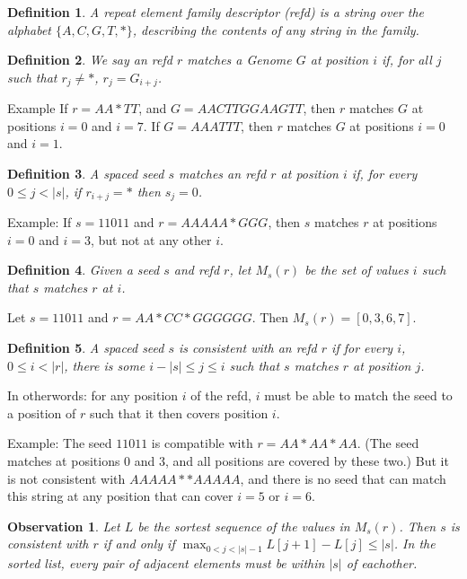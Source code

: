 \documentclass{article}
\newtheorem{definition}{Definition}
\newtheorem{observation}{Observation}
\begin{document}
\begin{definition}
  A {\it repeat element family descriptor (refd)} is a
  string over the alphabet $\{A,C,G,T,*\}$, describing the contents
  of any string in the family.
\end{definition}

\begin{definition}
  We say an refd $r$ {\it matches} a Genome $G$ at position $i$ if, for
  all $j$ such that $r_j \neq *$, $r_j = G_{i+j}$.
\end{definition}

Example If $r = AA*TT$, and $G = AACTTGGAAGTT$, then $r$ matches $G$
at positions $i=0$ and $i=7$.  If $G=AAATTT$, then $r$ matches $G$ at
positions $i=0$ and $i=1$.


\begin{definition}
  A spaced seed $s$ {\it matches} an refd $r$ at position $i$
  if, for every $0 \leq j < |s|$, if $r_{i+j} = *$ then $s_j = 0$.
\end{definition}

Example: If $s=11011$ and $r = AAAAA*GGG$, then $s$ matches $r$
at positions $i=0$ and $i=3$, but not at any other $i$.

\begin{definition}
  Given a seed $s$ and refd $r$, let $M_s(r)$ be the set of values $i$
  such that $s$ matches $r$ at $i$.
\end{definition}

Let $s=11011$ and $r = AA*CC*GGGGGG$.  Then $M_s(r) = [0, 3, 6, 7]$.


\begin{definition}
  A spaced seed $s$ is consistent with an refd $r$ if
  for every $i$, $0 \leq i < |r|$, there is some
  $i - |s| \leq j \leq i$ such that $s$ matches $r$ at position $j$.
\end{definition}

In otherwords: for any position $i$ of the refd, $i$ must be able to
match the seed to a position of $r$ such that it then covers position
$i$.

Example: The seed $11011$ is compatible with $r=AA*AA*AA$.  (The seed
matches at positions 0 and 3, and all positions are covered by these
two.)  But it is not consistent with $AAAAA**AAAAA$, and there is no
seed that can match this string at any position that can cover $i=5$
or $i=6$.

\begin{observation}
  Let $L$ be the sortest sequence of the values in $M_s(r)$.  Then $s$
  is consistent with $r$ if and only if $\max_{0 < j < |s|-1}
  L[j+1]-L[j] \leq |s|$.  In the sorted list, every pair of adjacent
  elements must be within $|s|$ of eachother.
\end{observation}
\end{document}
